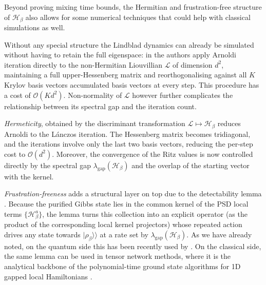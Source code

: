 Beyond proving mixing time bounds, the Hermitian and frustration-free structure of $\mathcal{H}_\beta$ also allows for some numerical techniques that could help with classical simulations as well. 

Without any special structure the Lindblad dynamics can already be simulated without having to retain the full eigenspace: in \cite{minganti2022arnoldi} the authors apply Arnoldi iteration directly to the non-Hermitian Liouvillian $\mathcal{L}$ of dimension $d^2$, maintaining a full upper-Hessenberg matrix and reorthogonalising against all $K$ Krylov basis vectors accumulated basis vectors at every step. This procedure has a cost of $\mathcal{O}(K d^2)$. Non-normality of $\mathcal{L}$ however further complicates the relationship between its spectral gap and the iteration count. 

\emph{Hermeticity}, obtained by the discriminant transformation $\mathcal{L} \mapsto \mathcal{H}_\beta$ reduces Arnoldi to the Lánczos iteration. The Hessenberg matrix becomes tridiagonal, and the iterations involve only the last two basis vectors, reducing the per-step cost to $\mathcal{O}(d^2)$. Moreover, the convergence of the Ritz values is now controlled directly by the spectral gap $\lambda_\text{gap}(\mathcal{H}_\beta)$ and the overlap of the starting vector with the kernel. 

\emph{Frustration-freeness} adds a structural layer on top due to the detectability lemma \cite{aharonov2009detectability,anshu2016simple}. Because the purified Gibbs state lies in the common kernel of the PSD local terms $\{\mathcal{H}_\beta^a\}$, the lemma turns this collection into an explicit operator (as the product of the corresponding local kernel projectors) whose repeated action drives any state towards $|\rho_\beta \rangle\rangle$ at a rate set by $\lambda_\text{gap}(\mathcal{H}_\beta)$. As we have already noted, on the quantum side this has been recently used by \cite{fang2026quantum}. On the classical side, the same lemma can be used in tensor network methods, where it is the analytical backbone of the polynomial-time ground state algorithms for 1D gapped local Hamiltonians \cite{landau2015polynomial, arad2017rigorous}.

\newpage
